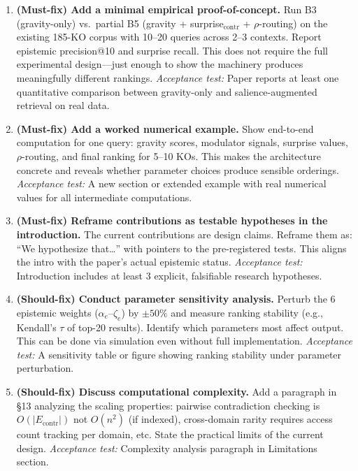 \documentclass[11pt,a4paper]{article}
\begin{document}
\begin{enumerate}[label=\textbf{R\arabic*.}, leftmargin=2em]

\item \textbf{(Must-fix) Add a minimal empirical proof-of-concept.}
Run B3 (gravity-only) vs.\ partial B5 (gravity + surprise$_{\text{contr}}$ + $\rho$-routing) on the existing 185-KO corpus with 10--20 queries across 2--3 contexts. Report epistemic precision@10 and surprise recall. This does not require the full experimental design---just enough to show the machinery produces meaningfully different rankings.
\emph{Acceptance test:} Paper reports at least one quantitative comparison between gravity-only and salience-augmented retrieval on real data.

\item \textbf{(Must-fix) Add a worked numerical example.}
Show end-to-end computation for one query: gravity scores, modulator signals, surprise values, $\rho$-routing, and final ranking for 5--10 KOs. This makes the architecture concrete and reveals whether parameter choices produce sensible orderings.
\emph{Acceptance test:} A new section or extended example with real numerical values for all intermediate computations.

\item \textbf{(Must-fix) Reframe contributions as testable hypotheses in the introduction.}
The current contributions are design claims. Reframe them as: ``We hypothesize that\ldots'' with pointers to the pre-registered tests. This aligns the intro with the paper's actual epistemic status.
\emph{Acceptance test:} Introduction includes at least 3 explicit, falsifiable research hypotheses.

\item \textbf{(Should-fix) Conduct parameter sensitivity analysis.}
Perturb the 6 epistemic weights ($\alpha_e$--$\zeta_e$) by $\pm 50\%$ and measure ranking stability (e.g., Kendall's $\tau$ of top-20 results). Identify which parameters most affect output. This can be done via simulation even without full implementation.
\emph{Acceptance test:} A sensitivity table or figure showing ranking stability under parameter perturbation.

\item \textbf{(Should-fix) Discuss computational complexity.}
Add a paragraph in \S13 analyzing the scaling properties: pairwise contradiction checking is $O(|E_{\text{contr}}|)$ not $O(n^2)$ (if indexed), cross-domain rarity requires access count tracking per domain, etc. State the practical limits of the current design.
\emph{Acceptance test:} Complexity analysis paragraph in Limitations section.


\end{enumerate}
\end{document}
